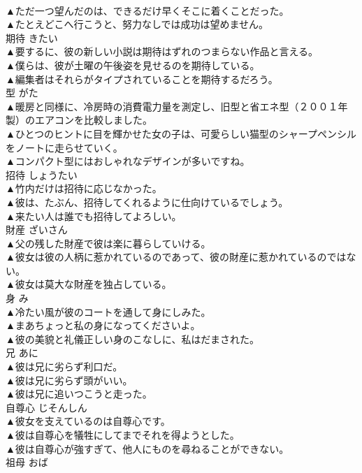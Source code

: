 \documentclass[8pt]{extreport}
\begin{document}
\begin{CJK}{UTF8}{min}
\\	▲ただ一つ望んだのは、できるだけ早くそこに着くことだった。 
\\	▲たとえどこへ行こうと、努力なしでは成功は望めません。 
\\	期待	きたい	
\\	▲要するに、彼の新しい小説は期待はずれのつまらない作品と言える。 
\\	▲僕らは、彼が土曜の午後姿を見せるのを期待している。 
\\	▲編集者はそれらがタイプされていることを期待するだろう。 
\\	型	がた	
\\	▲暖房と同様に、冷房時の消費電力量を測定し、旧型と省エネ型（２００１年製）のエアコンを比較しました。 
\\	▲ひとつのヒントに目を輝かせた女の子は、可愛らしい猫型のシャープペンシルをノートに走らせていく。 
\\	▲コンパクト型にはおしゃれなデザインが多いですね。 
\\	招待	しょうたい	
\\	▲竹内だけは招待に応じなかった。 
\\	▲彼は、たぶん、招待してくれるように仕向けているでしょう。 
\\	▲来たい人は誰でも招待してよろしい。 
\\	財産	ざいさん	
\\	▲父の残した財産で彼は楽に暮らしていける。 
\\	▲彼女は彼の人柄に惹かれているのであって、彼の財産に惹かれているのではない。 
\\	▲彼女は莫大な財産を独占している。 
\\	身	み	
\\	▲冷たい風が彼のコートを通して身にしみた。 
\\	▲まあちょっと私の身になってくださいよ。 
\\	▲彼の美貌と礼儀正しい身のこなしに、私はだまされた。 
\\	兄	あに	
\\	▲彼は兄に劣らず利口だ。 
\\	▲彼は兄に劣らず頭がいい。 
\\	▲彼は兄に追いつこうと走った。 
\\	自尊心	じそんしん	
\\	▲彼女を支えているのは自尊心です。 
\\	▲彼は自尊心を犠牲にしてまでそれを得ようとした。 
\\	▲彼は自尊心が強すぎて、他人にものを尋ねることができない。 
\\	祖母	おば	

\end{CJK}
\end{document}
